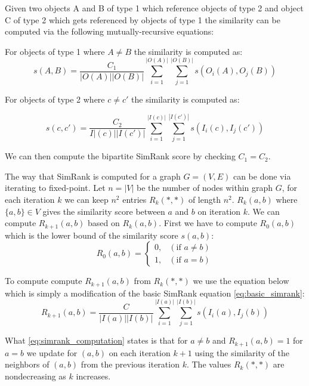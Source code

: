 \begin{definition}\label{def:bipartite_simrank} Given two objects A and B of type 1 which reference objects of type 2 and object C of type 2 which gets referenced by objects of type 1 the similarity can be computed via the following mutually-recursive equations:

	For objects of type 1 where $A \neq B$ the similarity is computed as:
	\begin{equation}\label{eq:bipartite_simrank1}
	s(A,B)= \frac{C_1}{|O(A)||O(B)|}\sum^{|O(A)|}_{i=1}\sum^{|O(B)|}_{j=1}s(O_i(A),O_j(B))
	\end{equation}

	For objects of type 2 where $c \neq c'$ the similarity is computed as:

	\begin{equation}\label{eq:bipartite_simrank2}
	s(c,c')= \frac{C_2}{I|(c)||I(c')|}\sum^{|I(c)|}_{i=1}\sum^{|I(c')|}_{j=1}s(I_i(c),I_j(c'))
	\end{equation}

	We can then compute the bipartite SimRank score by checking $C_1 = C_2$\cite{10.1145/775047.775126}.
\end{definition}

The way that SimRank is computed for a graph $G = (V,E)$ can be done via iterating to fixed-point. Let $n = |V|$ be the number of nodes within graph $G$, for each iteration $k$ we can keep $n^2$ entries $R_k(*,*)$ of length $n^2$. $R_k(a,b)$ where $\{a,b\} \in V$ gives the similarity score between $a$ and $b$ on iteration $k$\cite{10.1145/775047.775126}. We can compute $R_{k+1}(a,b)$ based on $R_k(a,b)$. First we have to compute $R_0(a,b)$ which is the lower bound of the similarity score $s(a,b)$:
\begin{equation}\label{eq:lowerbound_sim_score}
R_0(a,b)= \begin{cases}
0, & (\text{if } a \neq b) \\

1 ,& (\text{if } a = b)
\end{cases}
\end{equation}

To compute compute $R_{k+1}(a,b)$ from $R_k(*,*)$ we use the equation below which is simply a modification of the basic SimRank equation \ref{eq:basic_simrank}:
\begin{equation}\label{eq:simrank_computation}
R_{k+1}(a,b)= \frac{C}{|I(a)||I(b)|}\sum^{|I(a)|}_{i=1}\sum^{|I(b)|}_{j=1}s(I_i(a),I_j(b))
\end{equation}

What \autoref{eq:simrank_computation} states is that for $a \neq b$ and $R_{k+1}(a,b) = 1$ for $a = b$ we update for $(a,b)$ on each iteration $k+1$ using the similarity of the neighbors of $(a,b)$ from the previous iteration $k$. The values $R_k(*,*)$ are nondecreasing as $k$ increases.
